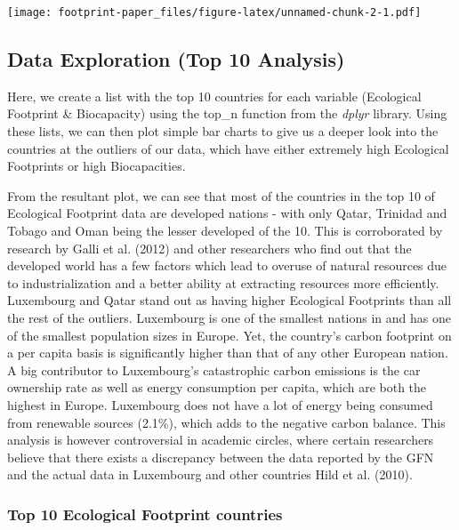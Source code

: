 \documentclass[
]{article}
\begin{document}
\texttt{[image: footprint-paper\_files/figure-latex/unnamed-chunk-2-1.pdf]}

\hypertarget{data-exploration-top-10-analysis}{%
\subsection{Data Exploration (Top 10
Analysis)}\label{data-exploration-top-10-analysis}}

Here, we create a list with the top 10 countries for each variable
(Ecological Footprint \& Biocapacity) using the top\_n function from the
\emph{dplyr} library. Using these lists, we can then plot simple bar
charts to give us a deeper look into the countries at the outliers of
our data, which have either extremely high Ecological Footprints or high
Biocapacities.

From the resultant plot, we can see that most of the countries in the
top 10 of Ecological Footprint data are developed nations - with only
Qatar, Trinidad and Tobago and Oman being the lesser developed of the
10. This is corroborated by research by Galli et al. (2012) and other
researchers who find out that the developed world has a few factors
which lead to overuse of natural resources due to industrialization and
a better ability at extracting resources more efficiently. Luxembourg
and Qatar stand out as having higher Ecological Footprints than all the
rest of the outliers. Luxembourg is one of the smallest nations in and
has one of the smallest population sizes in Europe. Yet, the country's
carbon footprint on a per capita basis is significantly higher than that
of any other European nation. A big contributor to Luxembourg's
catastrophic carbon emissions is the car ownership rate as well as
energy consumption per capita, which are both the highest in Europe.
Luxembourg does not have a lot of energy being consumed from renewable
sources (2.1\%), which adds to the negative carbon balance. This
analysis is however controversial in academic circles, where certain
researchers believe that there exists a discrepancy between the data
reported by the GFN and the actual data in Luxembourg and other
countries Hild et al. (2010).

\hypertarget{top-10-ecological-footprint-countries}{%
\subsubsection{Top 10 Ecological Footprint
countries}\label{top-10-ecological-footprint-countries}}
\end{document}

